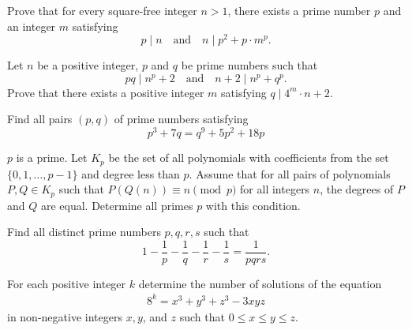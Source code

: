 \documentclass[problems.tex]{subfile}
\begin{document}
	\begin{problem}
		Prove that for every square-free integer $n>1$, there exists a prime number $p$ and an integer $m$ satisfying
		\[ p \mid n \quad \text{and} \quad n \mid p^2+p\cdot m^p. \]
	\end{problem}

	\begin{problem}
		Let $n$ be a positive integer, $p$ and $q$ be prime numbers such that
		\[ pq \mid n^p+2 \quad \text{and} \quad n+2 \mid n^p+q^p. \] Prove that there exists a positive integer $m$ satisfying $q \mid 4^m \cdot n +2$. %
	\end{problem}

	\begin{problem}
		Find all pairs $(p, q)$ of prime numbers satisfying
		\[ p^3+7q=q^9+5p^2+18p\]
	\end{problem}

	\begin{problem}
		$p$ is a prime. Let $K_p$ be the set of all polynomials with coefficients from the set $\{0,1,\dots ,p-1\}$ and degree less than $p$. Assume that for all pairs of polynomials $P,Q\in K_p$ such that $P(Q(n))\equiv n\pmod p$ for all integers $n$, the degrees of $P$ and $Q$ are equal. Determine all primes $p$ with this condition. %
	\end{problem}

	\begin{problem}
		Find all distinct prime numbers $p,q,r,s$ such that $$1-\frac{1}{p} - \frac{1}{q} -\frac{1}{r} - \frac{1}{s} =\frac{1}{pqrs}.$$
	\end{problem}

	\begin{problem}
		For each positive integer $k$ determine the number of solutions of the equation
		\begin{align*}
			8^k = x^3 + y^3 + z^3 - 3xyz
		\end{align*}
		in non-negative integers $x,y$, and $z$ such that $0 \leq x \leq y \leq z$.
	\end{problem}
\end{document}
